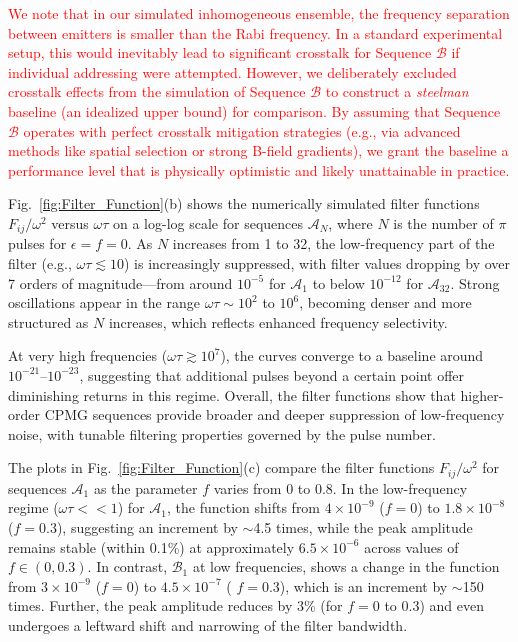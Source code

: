 \documentclass[%
 reprint,
 superscriptaddress,
 amsmath,amssymb,
 aps,
 prx,
]{revtex4-2}
\newcommand{\rev}[1]{\textcolor{red}{#1}}
\begin{document}
\rev{We note that in our simulated inhomogeneous ensemble, the frequency separation between emitters is smaller than the Rabi frequency. In a standard experimental setup, this would inevitably lead to significant crosstalk for Sequence $\mathcal{B}$ if individual addressing were attempted. However, we deliberately excluded crosstalk effects from the simulation of Sequence $\mathcal{B}$ to construct a \textit{steelman} baseline (an idealized upper bound) for comparison. By assuming that Sequence $\mathcal{B}$ operates with perfect crosstalk mitigation strategies (e.g., via advanced methods like spatial selection or strong B-field gradients), we grant the baseline a performance level that is physically optimistic and likely unattainable in practice.}

Fig.~\ref{fig:Filter_Function}(b) shows the numerically simulated filter functions \( F_{ij}/\omega^2 \) versus \( \omega \tau \) on a log-log scale for sequences \( \mathcal{A}_N \), where \( N \) is the number of \(\pi\) pulses for $\epsilon=f=0$. As \( N \) increases from 1 to 32, the low-frequency part of the filter (e.g., \( \omega \tau \lesssim 10 \)) is increasingly suppressed, with filter values dropping by over 7 orders of magnitude—from around \( 10^{-5} \) for \( \mathcal{A}_1 \) to below \( 10^{-12} \) for \( \mathcal{A}_{32} \). Strong oscillations appear in the range \( \omega \tau \sim 10^2 \) to \( 10^6 \), becoming denser and more structured as \( N \) increases, which reflects enhanced frequency selectivity.

At very high frequencies (\( \omega \tau \gtrsim 10^7 \)), the curves converge to a baseline around \( 10^{-21} \)–\( 10^{-23} \), suggesting that additional pulses beyond a certain point offer diminishing returns in this regime. Overall, the filter functions show that higher-order CPMG sequences provide broader and deeper suppression of low-frequency noise, with tunable filtering properties governed by the pulse number.

The plots in Fig.~\ref{fig:Filter_Function}(c) compare the filter functions \( F_{ij}/\omega^2 \) for sequences \( \mathcal{A}_1 \) as the parameter \( f \) varies from 0 to 0.8. In the low-frequency regime ($\omega\tau << 1$) for \( \mathcal{A}_1 \), the function shifts from $4\times10^{-9}$ ($f=0$) to $1.8\times10^{-8}$ ($f=0.3$), suggesting an increment by $\sim$4.5 times, while the peak amplitude remains stable (within 0.1\%) at approximately \( 6.5 \times 10^{-6} \) across values of \( f\in(0, 0.3) \). In contrast, \( \mathcal{B}_1 \) at low frequencies, shows a change in the function from $3\times10^{-9}$ ($f=0$) to $4.5\times10^{-7}$ (
$f=0.3$), which is an increment by $\sim$150 times. Further, the peak amplitude reduces by 3\% (for $f=0$ to 0.3) and even undergoes a leftward shift and narrowing of the filter bandwidth.
\end{document}
